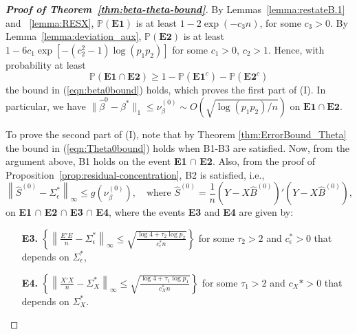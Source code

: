 \begin{proof}[\textbf{Proof of Theorem~\ref{thm:beta-theta-bound}}]
\noindent By Lemmas~\ref{lemma:restateB.1} and ~\ref{lemma:RESX}, $\mathbb{P}(\mathbf{E1})$ is at least $1-2\exp(-c_3n)$, for some $c_3>0$. 
By Lemma~\ref{lemma:deviation_aux}, $\mathbb{P}(\mathbf{E2})$  is at least $1-6c_1\exp[-(c_2^2-1)\log(p_1p_2)]$ for some $c_1>0$, $c_2>1$.
Hence, with probability at least 
\begin{equation*}
\mathbb{P} \left(\mathbf{E1} \cap \mathbf{E2} \right) \ge 1 - \mathbb{P} \left(\mathbf{E1}^c \right) - \mathbb{P} \left(\mathbf{E2}^c \right)
\end{equation*}
the bound in (\ref{eqn:beta0bound}) holds, which proves the first part of (I). In particular, we have $\|\hat{\beta}^0 - \beta^*\|_1 \le \nu_\beta^{(0)}\sim O(\sqrt{\log(p_1p_2)/n})$ on $\mathbf{E1} \cap \mathbf{E2}$. 

\noindent To prove the second part of (I), note that by Theorem \ref{thm:ErrorBound_Theta} the bound in (\ref{eqn:Theta0bound}) holds when B1-B3 are satisfied. Now, from the argument above, B1 holds on the event \textbf{E1} $\cap$ \textbf{E2}. Also, from the proof of Proposition~\ref{prop:residual-concentration}, B2 is satisfied, i.e., 
\begin{equation}\label{eqn:S0prob}
\left\|\widehat{S}^{(0)} - \Sigma_\epsilon^*\right\|_\infty\leq g(\nu_\beta^{(0)}),\quad \text{where }\widehat{S}^{(0)}= \frac{1}{n}(Y-X\widehat{B}^{(0)})'(Y-X\widehat{B}^{(0)}),
\end{equation}
on \textbf{E1} $\cap$ \textbf{E2} $\cap$ \textbf{E3} $\cap$ \textbf{E4}, where the events \textbf{E3} and \textbf{E4} are given by:
\begin{itemize}
\item[\bf E3.] $\left\{  \left\|\frac{E'E}{n}-\Sigma^*_\epsilon\right\|_\infty \leq \sqrt{\frac{\log 4 + \tau_2 \log p_2}{c_\epsilon^* n}} \right\}$ for some $\tau_2>2$ and $c_\epsilon^*>0$ that depends on $\Sigma_{\epsilon}^*$,
\item[\bf E4.] $\left\{  \left\|\frac{X'X}{n}-\Sigma^*_X\right\|_\infty \leq \sqrt{\frac{\log 4 + \tau_1 \log p_1}{c_X^* n}} \right\}$ for some $\tau_1>2$ and $c_X*>0$ that depends on $\Sigma_{X}^*$.
\end{itemize}


\end{proof}
